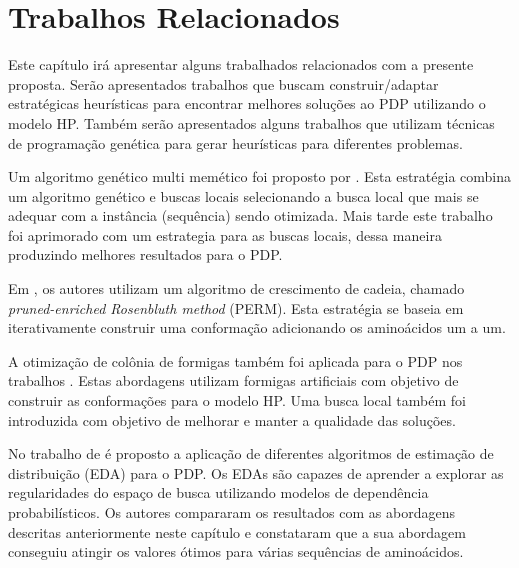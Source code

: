 \chapter{Trabalhos Relacionados}
\label{cap:Trabalhos Relacionados}

Este capítulo irá apresentar alguns trabalhados relacionados com a presente proposta. Serão apresentados trabalhos que buscam construir/adaptar estratégicas heurísticas para encontrar melhores soluções ao PDP utilizando o modelo HP. Também serão apresentados alguns trabalhos que utilizam técnicas de programação genética para gerar heurísticas para diferentes problemas.






Um algoritmo genético multi memético foi proposto por \cite{krasnogor2002multimeme}. Esta estratégia combina um algoritmo genético e buscas locais selecionando a busca local que mais se adequar com a instância (sequência) sendo otimizada. Mais tarde este trabalho foi aprimorado com um estrategia  para as buscas locais, dessa maneira produzindo melhores resultados para o PDP.

Em \cite{hsu2003growth}, os autores utilizam um algoritmo de crescimento de cadeia, chamado \textit{pruned-enriched Rosenbluth method} (PERM). Esta estratégia se baseia em iterativamente construir uma conformação adicionando os aminoácidos um a um. 

A otimização de colônia de formigas também foi aplicada para o PDP nos trabalhos \cite{shmygelska2002ant,shmygelska2003improved}. Estas abordagens utilizam formigas artificiais com objetivo de construir as conformações para o modelo HP. Uma busca local também foi introduzida com objetivo de melhorar e manter a qualidade das soluções. 

No trabalho de \cite{santana2008protein} é proposto a aplicação de diferentes algoritmos de estimação de distribuição (EDA) para o PDP. Os EDAs são capazes de aprender a explorar as regularidades do espaço de busca utilizando modelos de dependência probabilísticos. Os autores compararam os resultados com as abordagens descritas anteriormente neste capítulo e constataram que a sua abordagem conseguiu atingir os valores ótimos para várias sequências de aminoácidos.

